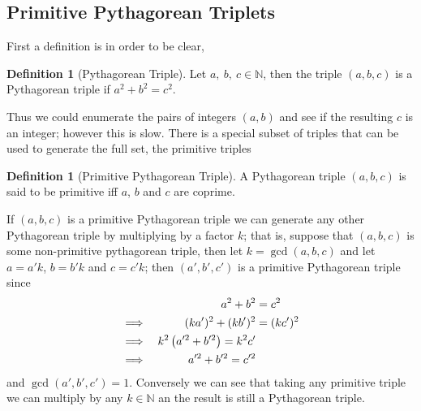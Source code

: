 \documentclass[oneside,12pt]{book}   	%
\newcounter{ex}
\newcounter{def}
\newcounter{pr}
\theoremstyle{definition}
\newtheorem{definition}[thm]{Definition}
\begin{document}
\begin{spacing}{1.618}
			
			
		\section{Primitive Pythagorean Triplets}
		
			First a definition is in order to be clear,
			\begin{definition}[Pythagorean Triple]
				Let $a,~b,~c\in\mathbb{N}$, then the triple $(a, b, c)$ is a Pythagorean triple if $a^2+b^2=c^2$. 
			\end{definition}
			Thus we could enumerate the pairs of integers $(a,b)$ and see if the resulting $c$ is an integer; however this is slow. There is a special subset of triples that can be used to generate the full set, the primitive triples
			\begin{definition}[Primitive Pythagorean Triple]
				A Pythagorean triple $(a, b, c)$ is said to be  primitive iff $a$, $b$ and $c$ are coprime. 
			\end{definition}
			If $(a,b,c)$ is a primitive Pythagorean triple we can generate any other Pythagorean triple by multiplying by a factor $k$; that is, suppose that $(a,b,c)$ is some non-primitive pythagorean triple, then let $k=\gcd{(a, b, c)}$ and let $a=a'k$, $b=b'k$ and $c=c'k$; then $(a', b', c')$ is a primitive Pythagorean triple since 
			\begin{alignat}{4}
				&&a^2+b^2&=c^2 \notag \\
				\implies && (ka')^2+(kb')^2&=(kc')^2 \notag \\
				\implies && k^2\left(a'^2+b'^2\right)=k^2c' \notag \\
				\implies && a'^2+b'^2=c'^2 \notag 
			\end{alignat}
			and $\gcd{(a', b', c')}=1$. Conversely we can see that taking any primitive triple we can multiply by any $k\in\mathbb{N}$ an the result is still a Pythagorean triple. 
			

\end{spacing}
\end{document}

